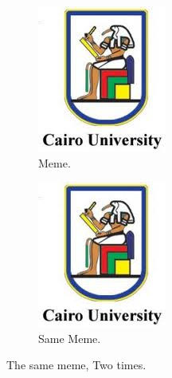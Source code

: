 \documentclass{article}
\begin{document}
    \begin{figure}[h!]
    \centering
    \begin{subfigure}[b]{0.4\linewidth}
        \includegraphics[width=\linewidth]{slogan.jpg}
        \caption{Meme.}
    \end{subfigure}
    \begin{subfigure}[b]{0.4\linewidth}
        \includegraphics[width=\linewidth]{slogan.jpg}
        \caption{Same Meme.}
    \end{subfigure}
    \caption{The same meme, Two times.}
    \label{fig:coffee}
    \end{figure}
\end{document}
